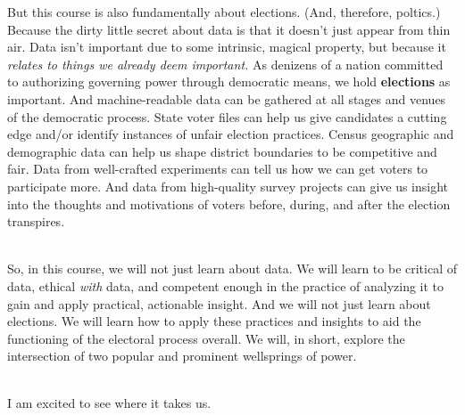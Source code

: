 \documentclass[11pt]{article}
\begin{document}
But this course is also fundamentally about elections. (And, therefore, poltics.) Because the dirty little secret about data is that it doesn't just appear from thin air. Data isn't important due to some intrinsic, magical property, but because it \textit{relates to things we already deem important.} As denizens of a nation committed to authorizing governing power through democratic means, we hold \textbf{elections} as important. And machine-readable data can be gathered at all stages and venues of the democratic process. State voter files can help us give candidates a cutting edge and/or identify instances of unfair election practices. Census geographic and demographic data can help us shape district boundaries to be competitive and fair. Data from well-crafted experiments can tell us how we can get voters to participate more. And data from high-quality survey projects can give us insight into the thoughts and motivations of voters before, during, and after the election transpires. 
\\\ 

So, in this course, we will not just learn about data. We will learn to be critical of data, ethical \textit{with} data, and competent enough in the practice of analyzing it to gain and apply practical, actionable insight. And we will not just learn about elections. We will learn how to apply these practices and insights to aid the functioning of the electoral process overall. We will, in short, explore the intersection of two popular and prominent wellsprings of power.
\\\

I am excited to see where it takes us.
\end{document}
